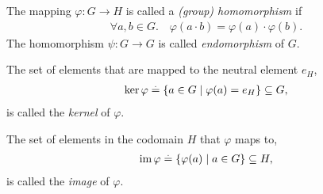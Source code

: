 \begin{defn}
\leavevmode\begin{defnlist}
    \item The mapping $\varphi : G \to H$ is called a \emph{(group) homomorphism} if \begin{align}
        \forall a, b \in G.\quad \varphi(a \cdot b) = \varphi(a) \cdot \varphi(b). \label{eq:homomorphism}
    \end{align} The homomorphism $\psi : G \to G$ is called \emph{endomorphism} of $G$.
    \item The set of elements that are mapped to the neutral element $e_H$, \begin{align}
        \ker{\varphi} \overset{.}{=} \{a \in G \mid \varphi(a) = e_H\} \subseteq G, \label{eq:kernel}
    \end{align} is called the \emph{kernel} of $\varphi$.
    \item The set of elements in the codomain $H$ that $\varphi$ maps to, \begin{align}
        \operatorname*{im}{\varphi} \overset{.}{=} \{\varphi(a) \mid a \in G\} \subseteq H,
    \end{align} is called the \emph{image} of $\varphi$.
\end{defnlist}
\end{defn}


